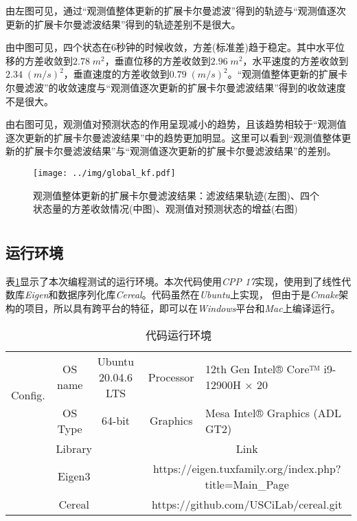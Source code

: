 \documentclass[12pt, onecolumn]{article}
\newcommand\normf{\fangsong}
\begin{document}
		由左图可见，通过“观测值整体更新的扩展卡尔曼滤波”得到的轨迹与“观测值逐次更新的扩展卡尔曼滤波结果”得到的轨迹差别不是很大。
		
		由中图可见，四个状态在6秒钟的时候收敛，方差(标准差)趋于稳定。其中水平位移的方差收敛到$2.78\;m^2$，垂直位移的方差收敛到$2.96\;m^2$，水平速度的方差收敛到$2.34\;(m/s)^2$，垂直速度的方差收敛到$0.79\;(m/s)^2$。“观测值整体更新的扩展卡尔曼滤波”的收敛速度与“观测值逐次更新的扩展卡尔曼滤波结果”得到的收敛速度不是很大。
		
		由右图可见，观测值对预测状态的作用呈现减小的趋势，且该趋势相较于“观测值逐次更新的扩展卡尔曼滤波结果”中的趋势更加明显。这里可以看到“观测值整体更新的扩展卡尔曼滤波结果”与“观测值逐次更新的扩展卡尔曼滤波结果”的差别。
			\begin{figure}[h]
				\centering
				\texttt{[image: ../img/global\_kf.pdf]}
				\caption{\normf 观测值整体更新的扩展卡尔曼滤波结果：滤波结果轨迹(左图)、四个状态量的方差收敛情况(中图)、观测值对预测状态的增益(右图)}
				\label{fig:global_kf}
			\end{figure}
	\newpage
	\section{\normf{附录}}
	\subsection{\normf 运行环境}
	表\ref{tab:代码运行环境}显示了本次编程测试的运行环境。本次代码使用\emph{CPP 17}实现，使用到了线性代数库\emph{Eigen}和数据序列化库\emph{Cereal}。代码虽然在\emph{Ubuntu}上实现， 但由于是\emph{Cmake}架构的项目，所以具有跨平台的特征，即可以在\emph{Windows}平台和\emph{Mac}上编译运行。
	
	\begin{table}[h]
	\centering
	\caption{\normf 代码运行环境}
	\label{tab:代码运行环境}
	\vspace{5pt}
	\begin{tabular}{ccc|cl}
	\toprule
	\multicolumn{1}{c|}{\multirow{2}{*}{Config.}} & OS name & Ubuntu 20.04.6 LTS & Processor              & 12th Gen Intel® Core™ i9-12900H × 20              \\ \cmidrule{2-5} 
	\multicolumn{1}{c|}{}                         & OS Type & 64-bit             & Graphics               & Mesa Intel® Graphics (ADL GT2)                    \\ \midrule[1pt]\midrule[1pt]
	\multicolumn{3}{c|}{Library}                                                 & \multicolumn{2}{c}{Link}                                                   \\ \midrule
	\multicolumn{3}{c|}{Eigen3}                                                  & \multicolumn{2}{c}{https://eigen.tuxfamily.org/index.php?title=Main\_Page} \\
	\multicolumn{3}{c|}{Cereal}                                                  & \multicolumn{2}{c}{https://github.com/USCiLab/cereal.git}                  \\ \bottomrule
	\end{tabular}
	\end{table}
	
\end{document}
